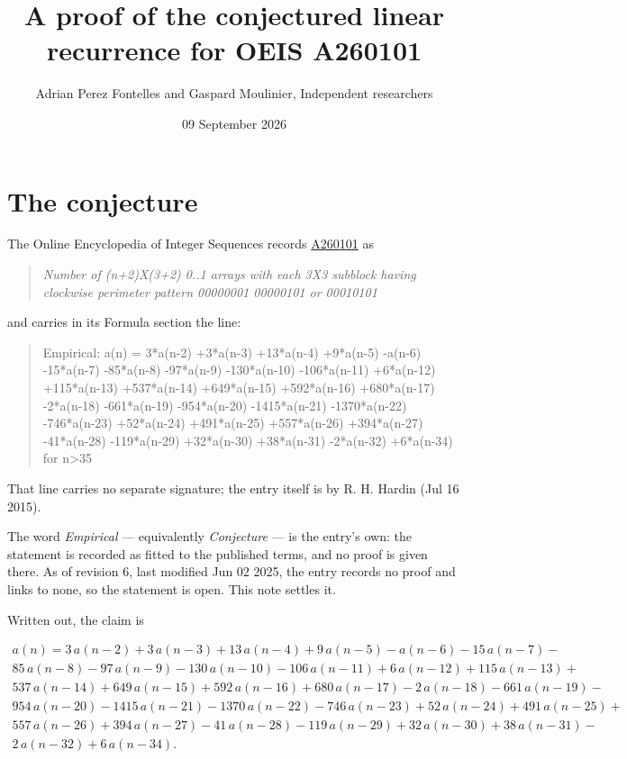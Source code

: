 \documentclass[11pt]{article}
\title{A proof of the conjectured linear recurrence for OEIS A260101}
\author{Adrian Perez Fontelles and Gaspard Moulinier, Independent researchers}
\date{09 September 2026}
\theoremstyle{definition}
\begin{document}
\maketitle
\section{The conjecture}

The Online Encyclopedia of Integer Sequences records \href{https://oeis.org/A260101}{A260101} as

\begin{quote}\itshape Number of (n+2)X(3+2) 0..1 arrays with each 3X3 subblock having clockwise perimeter pattern 00000001 00000101 or 00010101\end{quote}

and carries in its Formula section the line:

\begin{quote}\ttfamily Empirical: a(n) = 3*a(n-2) +3*a(n-3) +13*a(n-4) +9*a(n-5) -a(n-6) -15*a(n-7) -85*a(n-8) -97*a(n-9) -130*a(n-10) -106*a(n-11) +6*a(n-12) +115*a(n-13) +537*a(n-14) +649*a(n-15) +592*a(n-16) +680*a(n-17) -2*a(n-18) -661*a(n-19) -954*a(n-20) -1415*a(n-21) -1370*a(n-22) -746*a(n-23) +52*a(n-24) +491*a(n-25) +557*a(n-26) +394*a(n-27) -41*a(n-28) -119*a(n-29) +32*a(n-30) +38*a(n-31) -2*a(n-32) +6*a(n-34) for n>35\end{quote}

That line carries no separate signature; the entry itself is by R. H. Hardin (Jul 16 2015).

The word {\itshape Empirical} --- equivalently {\itshape Conjecture} --- is the entry's own: the statement is recorded as fitted to the published terms, and no proof is given there. As of revision 6, last modified Jun 02 2025, the entry records no proof and links to none, so the statement is open. This note settles it.

Written out, the claim is

\begin{multline*} a(n) = 3\,a(n-2) + 3\,a(n-3) + 13\,a(n-4) + 9\,a(n-5) - a(n-6) - 15\,a(n-7) - \\ 85\,a(n-8) - 97\,a(n-9) - 130\,a(n-10) - 106\,a(n-11) + 6\,a(n-12) + 115\,a(n-13) + \\ 537\,a(n-14) + 649\,a(n-15) + 592\,a(n-16) + 680\,a(n-17) - 2\,a(n-18) - 661\,a(n-19) - \\ 954\,a(n-20) - 1415\,a(n-21) - 1370\,a(n-22) - 746\,a(n-23) + 52\,a(n-24) + 491\,a(n-25) + \\ 557\,a(n-26) + 394\,a(n-27) - 41\,a(n-28) - 119\,a(n-29) + 32\,a(n-30) + 38\,a(n-31) - \\ 2\,a(n-32) + 6\,a(n-34). \end{multline*}
\end{document}
